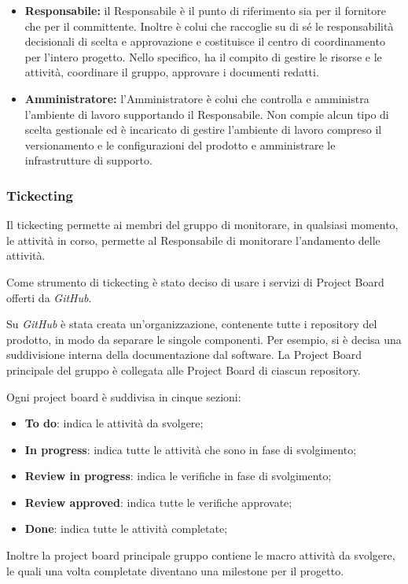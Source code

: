 \begin{itemize}
   				\item \textbf{Responsabile:} il Responsabile è il punto di riferimento sia per il fornitore che per il committente. Inoltre è colui che raccoglie su di sé le responsabilità decisionali di scelta e approvazione e costituisce il centro di coordinamento per l'intero progetto. Nello specifico, ha il compito di gestire le risorse e le attività, coordinare il gruppo, approvare i documenti redatti. 
   				\item \textbf{Amministratore:} l'Amministratore è colui che controlla e amministra l'ambiente di lavoro supportando il Responsabile. Non compie alcun tipo di scelta gestionale ed è incaricato di gestire  l'ambiente di lavoro compreso il versionamento e le configurazioni del prodotto e amministrare le infrastrutture di supporto.
   			\end{itemize}
   		
   		\subsubsection{Tickecting}
   		Il tickecting permette ai membri del gruppo di monitorare, in qualsiasi momento, le attività in corso, permette al Responsabile di monitorare l'andamento delle attività.
   		
   		Come strumento di tickecting è stato deciso di usare i servizi di Project Board offerti da \textit{GitHub\glos}.
   		
   		Su \textit{GitHub\glo} è stata creata un'organizzazione, contenente tutte i repository del prodotto, in modo da separare le singole componenti. Per esempio, si è decisa una suddivisione interna della documentazione dal software.
   		La Project Board principale del gruppo è collegata alle Project Board di ciascun repository.
   		
   		Ogni project board è suddivisa in cinque sezioni:
   		\begin{itemize}
   			\item \textbf{To do}: indica le attività da svolgere;
   			\item \textbf{In progress}: indica tutte le attività che sono in fase di svolgimento;
   			\item \textbf{Review in progress}: indica le verifiche in fase di svolgimento;
   			\item \textbf{Review approved}: indica tutte le verifiche approvate;
   			\item \textbf{Done}: indica tutte le attività completate;
   		\end{itemize}
   		Inoltre la project board principale gruppo contiene le macro attività da svolgere, le quali una volta completate diventano una milestone per il progetto.
   		
